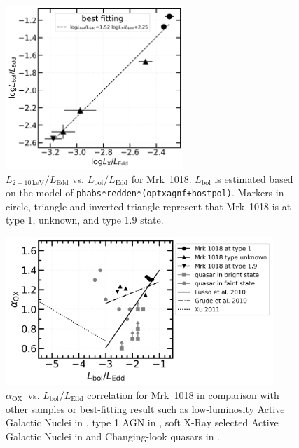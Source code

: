 \documentclass[twocolumn]{aastex63}
\newcommand{\alphaox}{$\alpha_\mathrm{OX}$}
\begin{document}
\begin{figure}
\centering
	\includegraphics[width=0.6\textwidth]{./pic/Mrk1018_LxvsLBol_fit.png}
    \caption{$L_\mathrm{2-10\,keV}/L_\mathrm{Edd}$ vs. $L_\mathrm{bol}/L_\mathrm{Edd}$ for Mrk~1018. $L_\mathrm{bol}$ is estimated based on the model of \texttt{phabs*redden*(optxagnf+hostpol)}. Markers in circle, triangle and inverted-triangle represent that Mrk~1018 is at type 1, unknown, and type 1.9 state.}
    \label{fig:xray-bol}
\end{figure}



\begin{figure}
\centering
	\includegraphics[width=0.9\textwidth]{./pic/Mrk1018_subplots_plus_alpha_ox_logLbol_rate.png}
    \caption{\alphaox\, vs. $L_\mathrm{bol}/L_\mathrm{Edd}$ correlation for Mrk~1018 in comparison with other samples or best-fitting result such as low-luminosity Active Galactic Nuclei in \citet[][]{2011ApJ...739...64X}, type 1 AGN in \citet{2010A&A...512A..34L}, soft X-Ray selected Active Galactic Nuclei in \citet[][]{2010ApJS..187...64G} and Changing-look quasars in \citet[][]{2019ApJ...883...76R}. }
    \label{fig:alphaox-bol}
\end{figure}
\end{document}
